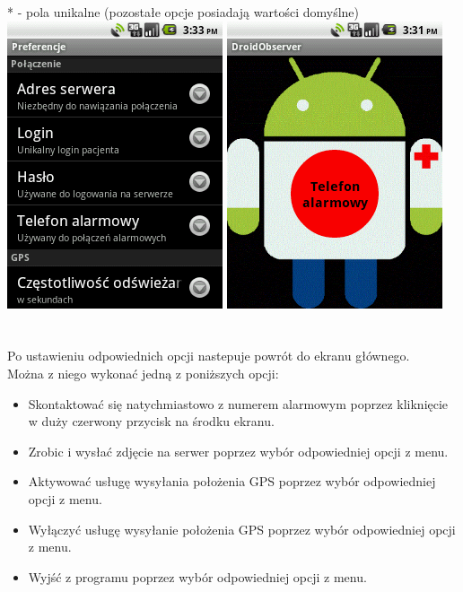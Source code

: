 \documentclass[11pt,a4paper]{article}
\begin{document}
* - pola unikalne (pozostałe opcje posiadają wartości domyślne)\\

\includegraphics[scale=0.9]{screen_settings.png}    
\includegraphics[scale=0.9]{screen_main.png}\\
\\\\
Po ustawieniu odpowiednich opcji nastepuje powrót do ekranu głównego. \\Można z niego wykonać jedną z poniższych opcji:
\begin{itemize}
\item Skontaktować się natychmiastowo z numerem alarmowym poprzez kliknięcie w duży czerwony przycisk na środku ekranu.
\item Zrobic i wysłać zdjęcie na serwer  poprzez wybór odpowiedniej opcji z menu.
\item Aktywować usługę wysyłania położenia GPS poprzez wybór odpowiedniej opcji z menu.
\item Wyłączyć usługę wysyłanie położenia GPS  poprzez wybór odpowiedniej opcji z menu.
\item Wyjść z programu poprzez wybór odpowiedniej opcji z menu.
\end{itemize}
\end{document}

